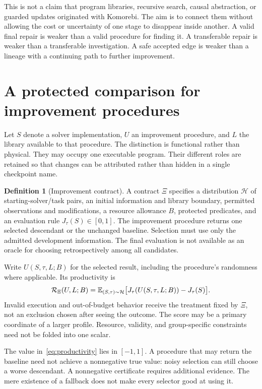 \documentclass[11pt,letterpaper]{article}
\theoremstyle{plain}
\theoremstyle{definition}
\newtheorem{definition}[theorem]{Definition}
\begin{document}
This is not a claim that program libraries, recursive search, causal abstraction, or guarded updates originated with Komorebi. The aim is to connect them without allowing the cost or uncertainty of one stage to disappear inside another. A valid final repair is weaker than a valid procedure for finding it. A transferable repair is weaker than a transferable investigation. A safe accepted edge is weaker than a lineage with a continuing path to further improvement.

\section{A protected comparison for improvement procedures}\label{sec:contract}
Let $S$ denote a solver implementation, $U$ an improvement procedure, and $L$ the library available to that procedure. The distinction is functional rather than physical. They may occupy one executable program. Their different roles are retained so that changes can be attributed rather than hidden in a single checkpoint name.

\begin{definition}[Improvement contract]\label{def:contract}
A contract $\Xi$ specifies a distribution $\mathcal H$ of starting-solver/task pairs, an initial information and library boundary, permitted observations and modifications, a resource allowance $B$, protected predicates, and an evaluation rule $J_\tau(S)\in[0,1]$. The improvement procedure returns one selected descendant or the unchanged baseline. Selection must use only the admitted development information. The final evaluation is not available as an oracle for choosing retrospectively among all candidates.
\end{definition}

Write $U(S,\tau,L;B)$ for the selected result, including the procedure's randomness where applicable. Its productivity is
\begin{equation}\label{eq:productivity}
\mathcal R_\Xi(U,L;B)=\mathbb E_{(S,\tau)\sim\mathcal H}
\big[J_\tau(U(S,\tau,L;B))-J_\tau(S)\big].
\end{equation}
Invalid execution and out-of-budget behavior receive the treatment fixed by $\Xi$, not an exclusion chosen after seeing the outcome. The score may be a primary coordinate of a larger profile. Resource, validity, and group-specific constraints need not be folded into one scalar.

The value in~\eqref{eq:productivity} lies in $[-1,1]$. A procedure that may return the baseline need not achieve a nonnegative true value: noisy selection can still choose a worse descendant. A nonnegative certificate requires additional evidence. The mere existence of a fallback does not make every selector good at using it.
\end{document}
